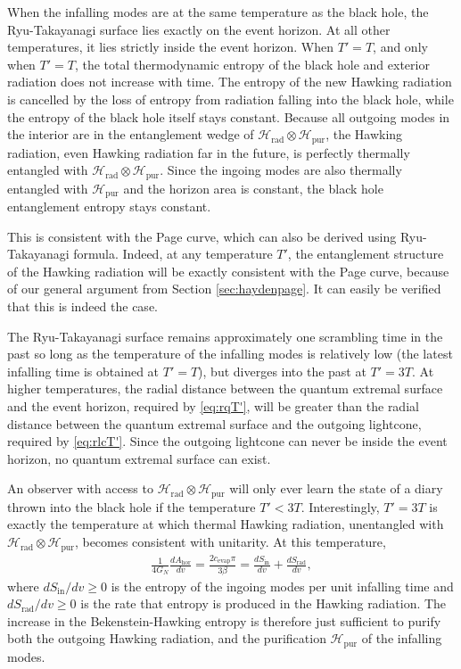 \documentclass[12pt]{article}
\newcommand{\Srad}{S_\text{rad} }
\begin{document}
When the infalling modes are at the same temperature as the black hole, the Ryu-Takayanagi surface lies exactly on the event horizon. At all other temperatures, it lies strictly inside the event horizon. When $T'=T$, and only when $T' = T$, the total thermodynamic entropy of the black hole and exterior radiation does not increase with time. The entropy of the new Hawking radiation is cancelled by the loss of entropy from radiation falling into the black hole, while the entropy of the black hole itself stays constant. Because all outgoing modes in the interior are in the entanglement wedge of $\mathcal{H}_\text{rad} \otimes \mathcal{H}_\text{pur}$, the Hawking radiation, even Hawking radiation far in the future, is perfectly thermally entangled with $\mathcal{H}_\text{rad} \otimes \mathcal{H}_\text{pur}$. Since the ingoing modes are also thermally entangled with $\mathcal{H}_\text{pur}$ and the horizon area is constant, the black hole entanglement entropy stays constant. 

This is consistent with the Page curve, which can also be derived using Ryu-Takayanagi formula. Indeed, at any temperature $T'$, the entanglement structure of the Hawking radiation will be exactly consistent with the Page curve, because of our general argument from Section \ref{sec:haydenpage}. It can easily be verified that this is indeed the case.

The Ryu-Takayanagi surface remains approximately one scrambling time in the past so long as the temperature of the infalling modes is relatively low (the latest infalling time is obtained at $T'=T$), but diverges into the past at $T' = 3T$. At higher temperatures, the radial distance between the quantum extremal surface and the event horizon, required by \eqref{eq:rqT'}, will be greater than the radial distance between the quantum extremal surface and the outgoing lightcone, required by \eqref{eq:rlcT'}. Since the outgoing lightcone can never be inside the event horizon, no quantum extremal surface can exist.

An observer with access to $\mathcal{H}_\text{rad} \otimes \mathcal{H}_\text{pur}$ will only ever learn the state of a diary thrown into the black hole if the temperature $T' < 3T$. Interestingly, $T'  = 3 T$ is exactly the temperature at which thermal Hawking radiation, unentangled with $\mathcal{H}_\text{rad} \otimes \mathcal{H}_\text{pur}$, becomes consistent with unitarity. At this temperature,
\begin{align} \label{eq:etaentropyincrease}
\frac{1}{4 G_N} \frac{d A_\text{hor}}{d v} = \frac{2 c_\text{evap} \pi}{3 \beta} =   \frac{d S_\text{in}}{d v} +\frac{d \Srad}{d v},
\end{align}
where $d S_\text{in}/d v \geq 0$ is the entropy of the ingoing modes per unit infalling time and $d \Srad/d v \geq 0$ is the rate that entropy is produced in the Hawking radiation. The increase in the Bekenstein-Hawking entropy is therefore just sufficient to purify both the outgoing Hawking radiation, and the purification $\mathcal{H}_\text{pur}$ of the infalling modes.
\end{document}
